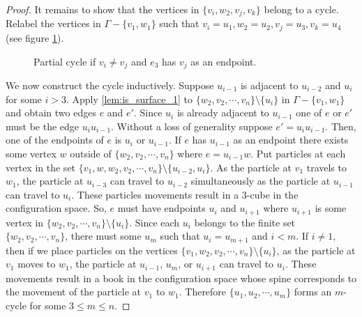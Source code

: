 \begin{proof}
    It remains to show that the vertices in \(\{v_i, w_2, v_j, v_k\}\) belong to a cycle.
    Relabel the vertices in \(\Gamma - \{v_1, w_1\}\) such that \(v_i = u_1, w_2 = u_2, v_j = u_3, v_k = u_4\) (see figure \ref{fig:lem:is_surface_2_3}).
    \begin{figure}
        \centering
        \caption{Partial cycle if \(v_i \neq v_j\) and \(e_3\) has \(v_j\) as an endpoint.}
        \label{fig:lem:is_surface_2_3}
    \end{figure}
    We now construct the cycle inductively.
    Suppose \(u_{i - 1}\) is adjacent to \(u_{i - 2}\) and \(u_i\) for some \(i > 3\).
    Apply \ref{lem:is_surface_1} to \(\{w_2, v_2, \cdots, v_n\}\setminus\{u_i\}\) in \(\Gamma - \{v_1, w_1\}\) and obtain
    two edges \(e\) and \(e'\).
    Since \(u_i\) is already adjacent to \(u_{i-1}\) one of \(e\) or \(e'\) must
    be the edge \(u_i u_{i -1}\).
    Without a loss of generality suppose \(e' = u_i u_{i-1}\).
    Then, one of the endpoints of \(e\) is \(u_i\) or \(u_{i-1}\).
    If \(e\) has \(u_{i-1}\) as an endpoint there exists
    some vertex \(w\) outside of \(\{w_2, v_2, \cdots, v_n\}\) where \(e = u_{i-1} w\).
    Put particles at each vertex in the set \(\{v_1, w, w_2, v_2, \cdots, v_n\}\setminus\{u_{i-2}, u_i\}\).
    As the particle at \(v_1\) travels to \(w_1\),
    the particle at \(u_{i-3}\) can travel to \(u_{i-2}\) simultaneously as the particle
    at \(u_{i-1}\) can travel to \(u_i\).
    These particles movements result in a \(3\)-cube in the configuration space.
    So, \(e\) must have endpoints \(u_i\) and \(u_{i+1}\) where \(u_{i+1}\) is some vertex in \(\{w_2, v_2, \cdots, v_n\}\setminus\{u_i\}\).
    Since each \(u_i\) belongs to the finite set \(\{w_2, v_2, \cdots, v_n\}\),
    there must some \(u_m\) such that \(u_i = u_{m+1}\) and \(i < m\).
    If \(i \neq 1\), then if we place particles on the vertices
    \(\{v_1, w_2, v_2, \cdots, v_n\}\setminus \{u_i\}\), as the particle at \(v_1\) moves to \(w_1\),
    the particle at \(u_{i - 1}\), \(u_m\), or \(u_{i + 1}\) can travel to \(u_i\).
    These movements result in a book in the configuration space whose spine corresponds to the movement of the particle at \(v_1\) to \(w_1\).
    Therefore \(\{u_1, u_2, \cdots, u_m\}\) forms an \(m\)-cycle for some \(3 \le m \le n\).
\end{proof}

